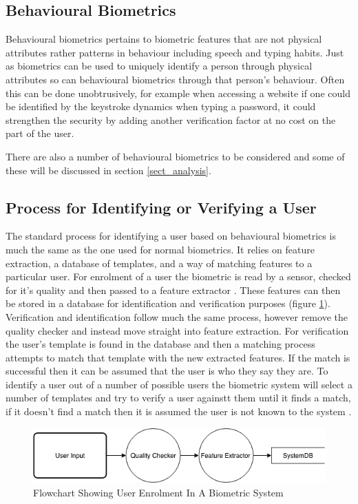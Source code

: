\documentclass[12pt]{article}
\begin{document}
	\subsection{Behavioural Biometrics}
	\label{subsect_behavioral_biometrics}
	Behavioural biometrics pertains to biometric features that are not physical attributes rather patterns in behaviour including speech and typing habits. Just as biometrics can be used to uniquely identify a person through physical attributes so can behavioural biometrics through that person's behaviour. Often this can be done unobtrusively, for example when accessing a website if one could be identified by the keystroke dynamics when typing a password, it could strengthen the security by adding another verification factor at no cost on the part of the user.
	
	There are also a number of behavioural biometrics to be considered and some of these will be discussed in section \ref{sect_analysis}.
	
	\subsection{Process for Identifying or Verifying a User}
	
	The standard process for identifying a user based on behavioural biometrics is much the same as the one used for normal biometrics. It relies on feature extraction, a database of templates, and a way of matching features to a particular user. For enrolment of a user the biometric is read by a sensor, checked for it's quality and then passed to a feature extractor \citep{jain2004introduction}. These features can then be stored in a database for identification and verification purposes (figure \ref{fig:flowchat:enrolment}). Verification and identification follow much the same process, however remove the quality checker and instead move straight into feature extraction. For verification the user's template is found in the database and then a matching process attempts to match that template with the new extracted features. If the match is successful then it can be assumed that the user is who they say they are. To identify a user out of a number of possible users the biometric system will select a number of templates and try to verify a user againstt them until it finds a match, if it doesn't find a match then it is assumed the user is not known to the system \citep{jain2004introduction}.
	
	\begin{figure}[H]
	    \centering
	    \includegraphics[width=\textwidth]{biometric_flowcharts-Enrolment.png}
	    \caption{Flowchart Showing User Enrolment In A Biometric System \citep{jain2004introduction}}
	    \label{fig:flowchat:enrolment}
	\end{figure}
	
\end{document}
